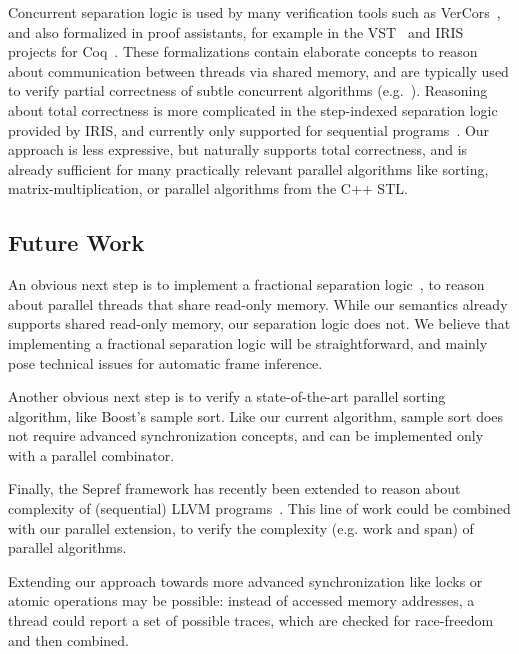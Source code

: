 \documentclass[a4paper,UKenglish,cleveref, autoref, thm-restate]{lipics-v2021}
\begin{document}
    Concurrent separation logic is used by many verification tools such
    as VerCors~\cite{Vercors}, and also formalized in proof assistants, for example in the VST~\cite{VST}
    and IRIS~\cite{JKJA18} projects for Coq~\cite{BeCa10}. These formalizations contain elaborate concepts to
    reason about communication between threads via shared memory, and are typically used to
    verify partial correctness of subtle concurrent algorithms (e.g.~\cite{MeJo21}).
    Reasoning about total correctness is more complicated in the step-indexed separation logic provided by IRIS,
    and currently only supported for sequential programs~\cite{SGGT21}.
    Our approach is less expressive, but naturally supports total correctness, and is already sufficient for
    many practically relevant parallel algorithms like sorting, matrix-multiplication, or parallel algorithms from
    the C++ STL.



%


    \subsection{Future Work}
      An obvious next step is to implement a fractional separation logic~\cite{BCOP05},
      to reason about parallel threads that share read-only memory. While our semantics
      already supports shared read-only memory, our separation logic does not.
      We believe that implementing a fractional separation logic will be straightforward,
      and mainly pose technical issues for automatic frame inference.

      Another obvious next step is to verify a state-of-the-art parallel sorting algorithm,
      like Boost's sample sort. Like our current algorithm, sample sort does not require
      advanced synchronization concepts, and can be implemented only with a parallel combinator.

      Finally, the Sepref framework has recently been extended to reason about complexity of (sequential)
      LLVM programs~\cite{HaLa21-toplas,HaLa21}. This line of work could be combined with our parallel extension, to verify the
      complexity (e.g. work and span) of parallel algorithms.

      Extending our approach towards more advanced
      synchronization like locks or atomic operations may be possible: instead of accessed memory addresses,
      a thread could report a set of possible traces, which are checked for race-freedom and then combined.
\end{document}
